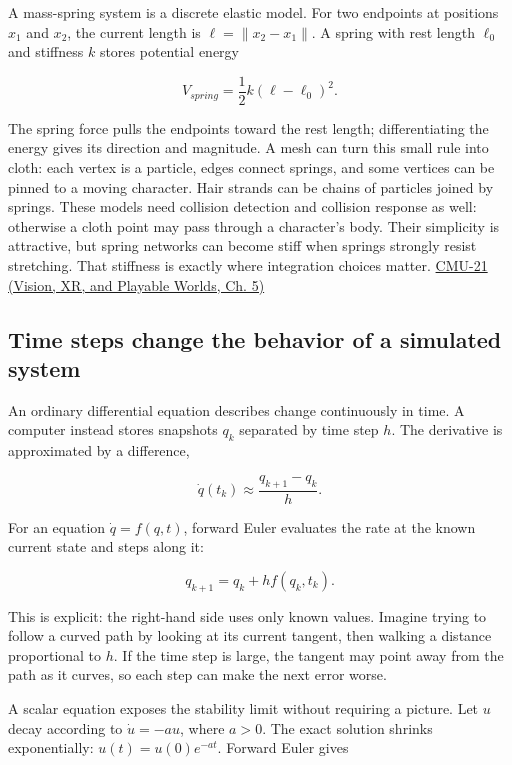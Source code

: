 A mass-spring system is a discrete elastic model. For two endpoints at positions \(x_1\) and \(x_2\), the current length is \(\ell=\|x_2-x_1\|\). A spring with rest length \(\ell_0\) and stiffness \(k\) stores potential energy

\[
V_{spring}=\frac12 k(\ell-\ell_0)^2.
\]

The spring force pulls the endpoints toward the rest length; differentiating the energy gives its direction and magnitude. A mesh can turn this small rule into cloth: each vertex is a particle, edges connect springs, and some vertices can be pinned to a moving character. Hair strands can be chains of particles joined by springs. These models need collision detection and collision response as well: otherwise a cloth point may pass through a character's body. Their simplicity is attractive, but spring networks can become stiff when springs strongly resist stretching. That stiffness is exactly where integration choices matter. \href{../07-Vision-XR-and-Playable-Worlds/main.pdf\#nameddest=04-visual-computing-ii-ch036-cmu-21---dynamics-and-time-integration}{CMU-21 (Vision, XR, and Playable Worlds, Ch. 5)}

\subsection{Time steps change the behavior of a simulated system}\label{04-visual-computing-ii-ch029-time-steps-change-the-behavior-of-a-simulated-system}

An ordinary differential equation describes change continuously in time. A computer instead stores snapshots \(q_k\) separated by time step \(h\). The derivative is approximated by a difference,

\[
\dot q(t_k)\approx\frac{q_{k+1}-q_k}{h}.
\]

For an equation \(\dot q=f(q,t)\), forward Euler evaluates the rate at the known current state and steps along it:

\[
q_{k+1}=q_k+h f(q_k,t_k).
\]

This is explicit: the right-hand side uses only known values. Imagine trying to follow a curved path by looking at its current tangent, then walking a distance proportional to \(h\). If the time step is large, the tangent may point away from the path as it curves, so each step can make the next error worse.

A scalar equation exposes the stability limit without requiring a picture. Let \(u\) decay according to \(\dot u=-a u\), where \(a>0\). The exact solution shrinks exponentially: \(u(t)=u(0)e^{-at}\). Forward Euler gives

